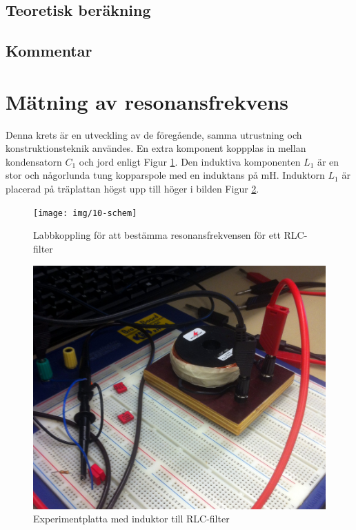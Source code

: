 \documentclass[11pt,a4paper]{article}
\begin{document}
\subsection{Teoretisk beräkning}\label{}

\subsection{Kommentar}\label{}


\section{Mätning av resonansfrekvens}\label{}
Denna krets är en utveckling av de föregående, samma utrustning och 
konstruktionsteknik användes. En extra komponent koppplas in mellan kondensatorn
$C_{1}$ och jord enligt Figur \ref{fig:10-schem}. Den induktiva komponenten
$L_{1}$ är en stor och någorlunda tung kopparspole med en induktans på 
\unit[1]{\si{\milli\henry}}. Induktorn $L_{1}$ är placerad på träplattan högst
upp till höger i bilden Figur \ref{fig:foto5}.

\begin{figure}
    \centering
    \texttt{[image: img/10-schem]}
    \caption[Mätning av resonansfrekvens]
    {Labbkoppling för att bestämma resonansfrekvensen för ett RLC-filter}
    \label{fig:10-schem}
\end{figure}

\begin{figure}
    \centering
    \includegraphics[width=0.8\linewidth]{img/foto5}
    \caption[]
    {Experimentplatta med induktor till RLC-filter}
    \label{fig:foto5}
\end{figure}
\end{document}
